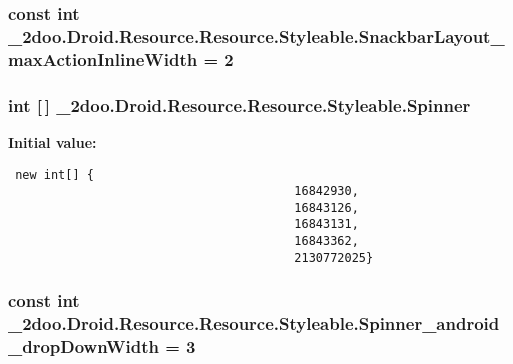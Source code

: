 \hypertarget{class__2doo_1_1_droid_1_1_resource_1_1_styleable_c5c4acfa6d1fbcc6fc4b2f17f83b781b}{
\subsubsection[{SnackbarLayout\_\-maxActionInlineWidth}]{\setlength{\rightskip}{0pt plus 5cm}const int \_\-2doo.Droid.Resource.Resource.Styleable.SnackbarLayout\_\-maxActionInlineWidth = 2}}
\label{class__2doo_1_1_droid_1_1_resource_1_1_styleable_c5c4acfa6d1fbcc6fc4b2f17f83b781b}


\hypertarget{class__2doo_1_1_droid_1_1_resource_1_1_styleable_b3e73c21bdfe8448ef02e8f06eff7cd0}{
\subsubsection[{Spinner}]{\setlength{\rightskip}{0pt plus 5cm}int \mbox{[}$\,$\mbox{]} \_\-2doo.Droid.Resource.Resource.Styleable.Spinner}}
\label{class__2doo_1_1_droid_1_1_resource_1_1_styleable_b3e73c21bdfe8448ef02e8f06eff7cd0}


\textbf{Initial value:}

\begin{Code}\begin{verbatim} new int[] {
                                        16842930,
                                        16843126,
                                        16843131,
                                        16843362,
                                        2130772025}
\end{verbatim}
\end{Code}
\hypertarget{class__2doo_1_1_droid_1_1_resource_1_1_styleable_193edf19ea60e2d74cd266ade278dae0}{
\subsubsection[{Spinner\_\-android\_\-dropDownWidth}]{\setlength{\rightskip}{0pt plus 5cm}const int \_\-2doo.Droid.Resource.Resource.Styleable.Spinner\_\-android\_\-dropDownWidth = 3}}
\label{class__2doo_1_1_droid_1_1_resource_1_1_styleable_193edf19ea60e2d74cd266ade278dae0}


